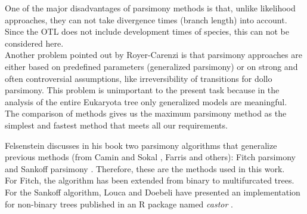   One of the major disadvantages of parsimony methods is that, unlike likelihood approaches, they 
    can not take divergence times (branch length) into account. Since the OTL does not include 
    development times of species, this can not be considered here. \\
  Another problem pointed out by Royer-Carenzi is that parsimony approaches are either based on 
    predefined parameters (generalized parsimony) or on strong and often controversial assumptions, 
    like irreversibility of transitions for dollo parsimony. This problem is unimportant to the 
    present task because in the analysis of the entire Eukaryota tree only generalized models are 
    meaningful. \\
  The comparison of methods gives us the maximum parsimony method as the simplest and fastest method 
    that meets all our requirements.

  Felsenstein \cite{Felsenstein2003} discusses in his book two parsimony algorithms that generalize 
    previous methods (from Camin and Sokal \cite{Camin1965}, Farris \cite{Farris1970} and others): 
    Fitch parsimony \cite{Fitch1971} and Sankoff parsimony \cite{Sankoff1975}. Therefore, these are 
    the methods used in this work. \\
   For Fitch, the algorithm has been extended from binary to multifurcated trees. For the Sankoff 
    algorithm, Louca and Doebeli have presented an implementation for non-binary trees published in 
    an R package named \textit{castor} \cite{Louca2017}.

